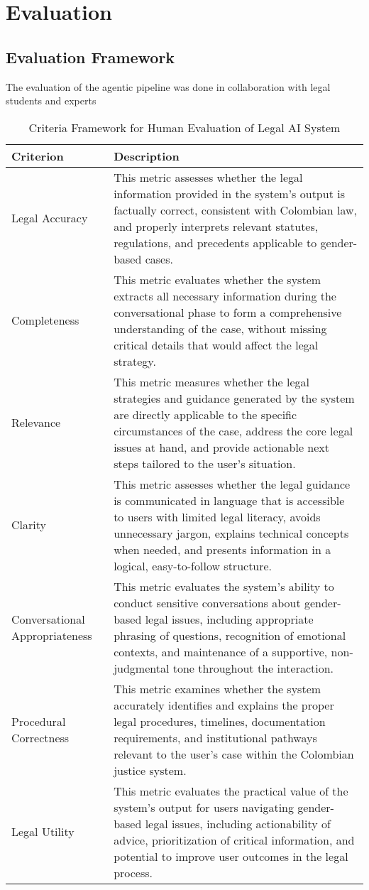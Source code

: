 \chapter{Evaluation}
\section{Evaluation Framework}
The evaluation of the agentic pipeline was done in collaboration with legal students and experts
\begin{table}[h]
    \centering
    \caption{Criteria Framework for Human Evaluation of Legal AI System}
    \begin{tabular}{p{3cm}p{12cm}}
    \hline
    \textbf{Criterion} & \textbf{Description} \\
    \hline
    Legal Accuracy & This metric assesses whether the legal information provided in the system's output is factually correct, consistent with Colombian law, and properly interprets relevant statutes, regulations, and precedents applicable to gender-based cases. \\
    \hline
    Completeness & This metric evaluates whether the system extracts all necessary information during the conversational phase to form a comprehensive understanding of the case, without missing critical details that would affect the legal strategy. \\
    \hline
    Relevance & This metric measures whether the legal strategies and guidance generated by the system are directly applicable to the specific circumstances of the case, address the core legal issues at hand, and provide actionable next steps tailored to the user's situation. \\
    \hline
    Clarity & This metric assesses whether the legal guidance is communicated in language that is accessible to users with limited legal literacy, avoids unnecessary jargon, explains technical concepts when needed, and presents information in a logical, easy-to-follow structure. \\
    \hline
    Conversational Appropriateness & This metric evaluates the system's ability to conduct sensitive conversations about gender-based legal issues, including appropriate phrasing of questions, recognition of emotional contexts, and maintenance of a supportive, non-judgmental tone throughout the interaction. \\
    \hline
    Procedural Correctness & This metric examines whether the system accurately identifies and explains the proper legal procedures, timelines, documentation requirements, and institutional pathways relevant to the user's case within the Colombian justice system. \\
    \hline
    Legal Utility & This metric evaluates the practical value of the system's output for users navigating gender-based legal issues, including actionability of advice, prioritization of critical information, and potential to improve user outcomes in the legal process. \\
    \hline
    \end{tabular}
\end{table}


